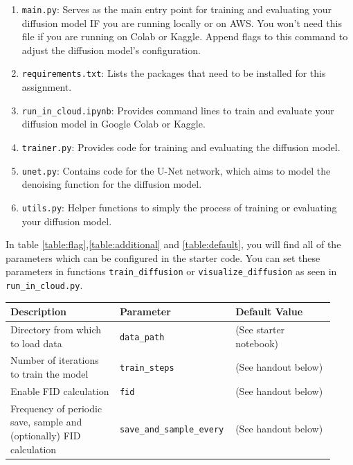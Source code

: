 \documentclass[11pt,addpoints,answers]{exam}
\begin{document}
\begin{questions}
\begin{enumerate}
    \item \lstinline{main.py}: Serves as the main entry point for training and evaluating your diffusion model IF you are running locally or on AWS. You won't need this file if you are running on Colab or Kaggle. Append flags to this command to adjust the diffusion model's configuration.
    
    \item \lstinline{requirements.txt}: Lists the packages that need to be installed for this assignment.
    
    \item \lstinline{run_in_cloud.ipynb}: Provides command lines to train and evaluate your diffusion model in Google Colab or Kaggle.
    
    \item \lstinline{trainer.py}: Provides code for training and evaluating the diffusion model.
    
    \item \lstinline{unet.py}: Contains code for the U-Net network, which aims to model the denoising function for the diffusion model.

    \item \lstinline{utils.py}: Helper functions to simply the process of training or evaluating your diffusion model.
    
\end{enumerate}



In table \ref{table:flag},\ref{table:additional} and \ref{table:default}, you will find all of the parameters which can be configured in the starter code. You can set these parameters in functions \lstinline{train_diffusion} or \lstinline{visualize_diffusion} as seen in \lstinline{run_in_cloud.py}.

\begin{table}[H]
\centering
\begin{tabular}{|p{0.33\linewidth}|p{0.3\linewidth}|p{0.3\linewidth}|}
\hline
Description & Parameter & Default Value \\ \hline
Directory from which to load data &  \lstinline|data_path| & (See starter notebook) \\ \hline
Number of iterations to train the model &  \lstinline|train_steps| & (See handout below) \\ \hline
Enable FID calculation  &  \lstinline|fid| & (See handout below) \\ \hline
Frequency of periodic save, sample and (optionally) FID calculation  &  \lstinline|save_and_sample_every| & (See handout below) \\ \hline


\end{tabular}
\end{table}
\end{questions}
\end{document}
